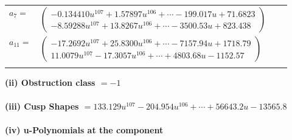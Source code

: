 \documentclass[1p]{elsarticle_modified}
\theoremstyle{definition}
\begin{document}
\begin{tabular}{m{7pt} m{180pt} m{7pt} m{180pt} }
\flushright $a_{7}=$&$\begin{pmatrix}-0.134410 u^{107}+1.57897 u^{106}+\cdots-199.017 u+71.6823\\-8.59288 u^{107}+13.8267 u^{106}+\cdots-3500.53 u+823.438\end{pmatrix}$ \\
\flushright $a_{11}=$&$\begin{pmatrix}-17.2692 u^{107}+25.8300 u^{106}+\cdots-7157.94 u+1718.79\\11.0079 u^{107}-17.3057 u^{106}+\cdots+4803.68 u-1152.57\end{pmatrix}$\\&\end{tabular}
\flushleft \textbf{(ii) Obstruction class $= -1$}\\~\\
\flushleft \textbf{(iii) Cusp Shapes $= 133.129 u^{107}-204.954 u^{106}+\cdots+56643.2 u-13565.8$}\\~\\
\newpage\renewcommand{\arraystretch}{1}
\flushleft \textbf{(iv) u-Polynomials at the component}\newline \\
\end{document}
